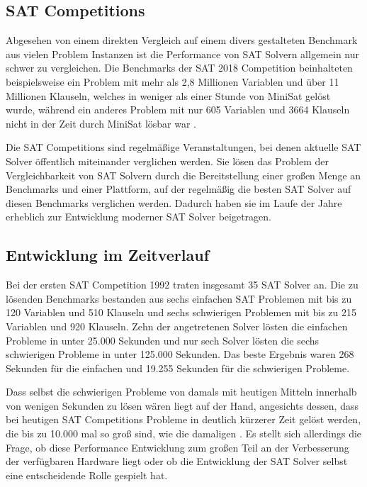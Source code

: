 \documentclass[conference,compsoc,final,a4paper]{IEEEtran}
\begin{document}
\subsection{SAT Competitions}
Abgesehen von einem direkten Vergleich auf einem divers gestalteten Benchmark aus vielen Problem Instanzen ist die Performance von SAT Solvern allgemein nur schwer zu vergleichen. Die Benchmarks der SAT 2018 Competition beinhalteten beispielsweise ein Problem mit mehr als 2,8 Millionen Variablen und über 11 Millionen Klauseln, welches in weniger als einer Stunde von MiniSat gelöst wurde, während ein anderes Problem mit nur 605 Variablen und 3664 Klauseln nicht in der Zeit durch MiniSat lösbar war \cite{sat_2018_proceedings}.

Die SAT Competitions sind regelmäßige Veranstaltungen, bei denen aktuelle SAT Solver öffentlich miteinander verglichen werden. Sie lösen das Problem der Vergleichbarkeit von SAT Solvern durch die Bereitstellung einer großen Menge an Benchmarks und einer Plattform, auf der regelmäßig die besten SAT Solver auf diesen Benchmarks verglichen werden. Dadurch haben sie im Laufe der Jahre erheblich zur Entwicklung moderner SAT Solver beigetragen. \cite{the_international_sat_competitions}


\subsection{Entwicklung im Zeitverlauf}
Bei der ersten \cite{the_international_sat_competitions} SAT Competition 1992 traten insgesamt 35 SAT Solver an. Die zu lösenden Benchmarks bestanden aus sechs einfachen SAT Problemen mit bis zu 120 Variablen und 510 Klauseln und sechs schwierigen Problemen mit bis zu 215 Variablen und 920 Klauseln. Zehn der angetretenen Solver lösten die einfachen Probleme in unter 25.000 Sekunden und nur sech Solver lösten die sechs schwierigen Probleme in unter 125.000 Sekunden. Das beste Ergebnis waren 268 Sekunden für die einfachen und 19.255 Sekunden für die schwierigen Probleme. \cite{competition_1992}

Dass selbst die schwierigen Probleme von damals mit heutigen Mitteln innerhalb von wenigen Sekunden zu lösen wären liegt auf der Hand, angesichts dessen, dass bei heutigen SAT Competitions Probleme in deutlich kürzerer Zeit gelöst werden, die bis zu 10.000 mal so groß sind, wie die damaligen \cite{sat_2018_proceedings}. Es stellt sich allerdings die Frage, ob diese Performance Entwicklung zum großen Teil an der Verbesserung der verfügbaren Hardware liegt oder ob die Entwicklung der SAT Solver selbst eine entscheidende Rolle gespielt hat.
\end{document}
